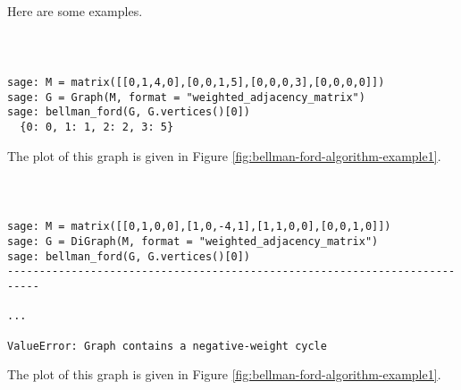 Here are some examples.

%
\begin{center}
\fontsize{9pt}{9pt}
\selectfont
\tt
\begin{lstlisting}

sage: M = matrix([[0,1,4,0],[0,0,1,5],[0,0,0,3],[0,0,0,0]])
sage: G = Graph(M, format = "weighted_adjacency_matrix")
sage: bellman_ford(G, G.vertices()[0])
  {0: 0, 1: 1, 2: 2, 3: 5}

\end{lstlisting}
\end{center}
The plot of this graph is given in Figure
\ref{fig:bellman-ford-algorithm-example1}.



%
\begin{center}
\fontsize{9pt}{9pt}
\selectfont
\tt
\begin{lstlisting}

sage: M = matrix([[0,1,0,0],[1,0,-4,1],[1,1,0,0],[0,0,1,0]])
sage: G = DiGraph(M, format = "weighted_adjacency_matrix")
sage: bellman_ford(G, G.vertices()[0])
---------------------------------------------------------------------------

...

ValueError: Graph contains a negative-weight cycle

\end{lstlisting}
\end{center}

The plot of this graph is given in Figure
\ref{fig:bellman-ford-algorithm-example1}.



